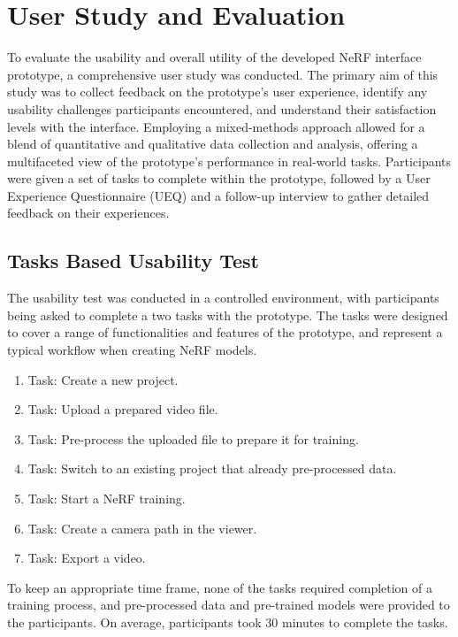 \section{User Study and Evaluation}
\label{sec:methodology:study}

To evaluate the usability and overall utility of the developed NeRF interface prototype, a comprehensive user study was conducted. 
The primary aim of this study was to collect feedback on the prototype's user experience, identify any usability challenges participants encountered, and understand their satisfaction levels with the interface. 
Employing a mixed-methods approach allowed for a blend of quantitative and qualitative data collection and analysis, offering a multifaceted view of the prototype's performance in real-world tasks.
Participants were given a set of tasks to complete within the prototype, followed by a User Experience Questionnaire (UEQ) and a follow-up interview to gather detailed feedback on their experiences.

\subsection*{Tasks Based Usability Test}
\label{sec:methodology:study:tasks}

The usability test was conducted in a controlled environment, with participants being asked to complete a two tasks with the prototype.
The tasks were designed to cover a range of functionalities and features of the prototype, and represent a typical workflow when creating NeRF models.

\begin{enumerate}
  \item Task: Create a new project.
  \item Task: Upload a prepared video file.
  \item Task: Pre-process the uploaded file to prepare it for training.
  \item Task: Switch to an existing project that already pre-processed data.
  \item Task: Start a NeRF training.
  \item Task: Create a camera path in the viewer.
  \item Task: Export a video.
\end{enumerate}

To keep an appropriate time frame, none of the tasks required completion of a training process, and pre-processed data and pre-trained models were provided to the participants.
On average, participants took 30 minutes to complete the tasks.

